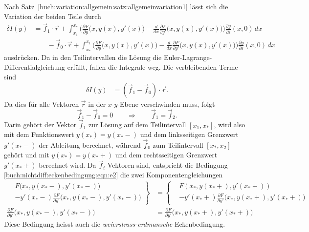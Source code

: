 Nach Satz~\ref{buch:variation:allgemein:satz:allgemeinvariation1} 
lässt sich die Variation der beiden Teile durch 
\begin{align*}
\delta I(y)
&=
\vec{f}_1\cdot \vec{r}
+
\int_{x_1}^{x_*}
\biggl(
\frac{\partial F}{\partial y}\bigl(x,y(x),y'(x)\bigr)
-
\frac{d}{dx}
\frac{\partial F}{\partial y'}\bigl(x,y(x),y'(x)\bigr)
\biggr)
\frac{\partial y}{\partial\varepsilon}(x,0)\,dx
\\
&\qquad
-
\vec{f}_0\cdot \vec{r}
+
\int_{x_*}^{x_1}
\biggl(
\frac{\partial F}{\partial y}\bigl(x,y(x),y'(x)\bigr)
-
\frac{d}{dx}
\frac{\partial F}{\partial y'}\bigl(x,y(x),y'(x)\bigr)
\biggr)
\frac{\partial y}{\partial\varepsilon}(x,0)\,dx
\end{align*}
ausdrücken.
Da in den Teilintervallen die Lösung die Euler-Lagrange-Differentialgleichung
erfüllt, fallen die Integrale weg.
Die verbleibenden Terme sind
\begin{align*}
\delta I(y)
&=
(\vec{f}_1-\vec{f}_0)\cdot \vec{r}.
\end{align*}
Da dies für alle Vektoren $\vec{r}$ in der $x$-$y$-Ebene verschwinden muss,
folgt
\begin{equation}
\vec{f}_1-\vec{f}_0
=
0
\qquad\Rightarrow\qquad
\vec{f}_1=\vec{f}_2.
\label{buch:nichtdiff:eckenbedingung:eqn:e2}
\end{equation}
Darin gehört der Vektor $\vec{f}_1$ zur Lösung auf dem Teilintervall
$[x_1,x_*]$,
wird also mit dem Funktionswert $y(x_*)=y(x_*-)$ und dem linksseitigen Grenzwert
$y'(x_*-)$ der Ableitung berechnet, während $\vec{f}_0$ zum Teilintervall
$[x_*,x_2]$ gehört und mit $y(x_*)=y(x_*+)$ und dem rechtsseitigen
Grenzwert $y'(x_*+)$ berechnet wird.
Da $\vec{f}_i$ Vektoren sind, entspricht die Bedingung
\eqref{buch:nichtdiff:eckenbedingung:eqn:e2}
die zwei Komponentengleichungen
\begin{align*}
\left.
\begin{aligned}
&F\bigl(x_*,y(x_*-),y'(x_*-)\bigr)
\\
&- 
y'(x_*-)
\frac{\partial F}{\partial y'}\bigl(x_*,y(x_*-), y'(x_*-)\bigr)
\end{aligned}\right\}
&=
\left\{
\begin{aligned}
&F(x_*,y(x_*+),y'(x_*+))
\\
&- 
y'(x_*+)
\frac{\partial F}{\partial y'}\bigl(x_*,y(x_*+), y'(x_*+)\bigr)
\end{aligned}
\right.
\\
\frac{\partial F}{\partial y'}\bigl(x_*,y(x_*-), y'(x_*-)\bigr)
&=
\frac{\partial F}{\partial y'}\bigl(x_*,y(x_*+), y'(x_*+)\bigr)
\end{align*}
Diese Bedingung heisst auch die {\em weierstrass-erdmansche} Eckenbedingung.
%
%

